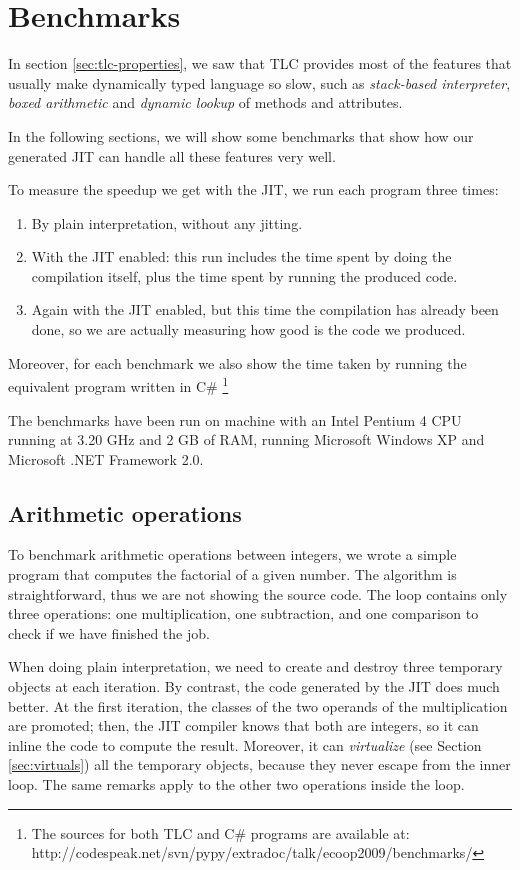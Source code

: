 \section{Benchmarks}
\label{sec:benchmarks}

In section \ref{sec:tlc-properties}, we saw that TLC provides most of the
features that usually make dynamically typed language so slow, such as
\emph{stack-based interpreter}, \emph{boxed arithmetic} and \emph{dynamic lookup} of
methods and attributes.

In the following sections, we will show some benchmarks that show how our
generated JIT can handle all these features very well.

To measure the speedup we get with the JIT, we run each program three times:

\begin{enumerate}
\item By plain interpretation, without any jitting.
\item With the JIT enabled: this run includes the time spent by doing the
  compilation itself, plus the time spent by running the produced code.
\item Again with the JIT enabled, but this time the compilation has already
  been done, so we are actually measuring how good is the code we produced.
\end{enumerate}

Moreover, for each benchmark we also show the time taken by running the
equivalent program written in C\# \footnote{The sources for both TLC and C\#
  programs are available at:
  http://codespeak.net/svn/pypy/extradoc/talk/ecoop2009/benchmarks/}

The benchmarks have been run on machine with an Intel Pentium 4 CPU running at
3.20 GHz and 2 GB of RAM, running Microsoft Windows XP and Microsoft .NET
Framework 2.0.

\subsection{Arithmetic operations}

To benchmark arithmetic operations between integers, we wrote a simple program
that computes the factorial of a given number.  The algorithm is
straightforward, thus we are not showing the source code.  The loop contains only three operations: one
multiplication, one subtraction, and one comparison to check if we have
finished the job.

When doing plain interpretation, we need to create and destroy three temporary
objects at each iteration.  By contrast, the code generated by the JIT does
much better.  At the first iteration, the classes of the two operands of the
multiplication are promoted; then, the JIT compiler knows that both are
integers, so it can inline the code to compute the result.  Moreover, it can
\emph{virtualize} (see Section \ref{sec:virtuals}) all the temporary objects, because they never escape from
the inner loop.  The same remarks apply to the other two operations inside
the loop.

